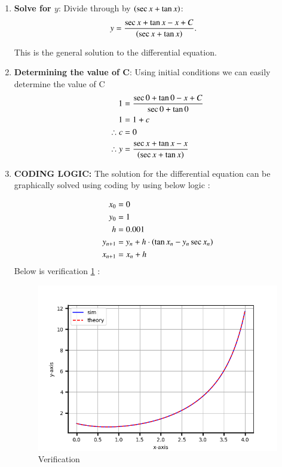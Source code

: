 \documentclass[journal]{IEEEtran}
\begin{document}
\begin{enumerate}
  \item \textbf{Solve for $y$}:
  Divide through by $\left(\sec x + \tan x\right)$:
  \begin{align}                                                                      
  	    y &= \frac{\sec x + \tan x - x + C}{\left(\sec x + \tan x\right)}.
  \end{align} 

  This is the general solution to the differential equation.
 \item \textbf{Determining the value of C}:
    Using initial conditions we can easily determine the value of C
    \begin{align}    
	    1 &= \frac{\sec {0} + \tan {0} -x +C}{\sec{0}+\tan{0}} \\
	    1 &= 1+c \\
	    \therefore c &= 0 \\
	    \therefore y &= \frac{\sec x + \tan x - x}{\left(\sec x + \tan x\right)}
    \end{align}
    \item \textbf{CODING LOGIC:} The solution for the differential equation can be graphically solved using coding by using below logic :

\begin{align} 
	x_0 &= 0 \\ 
	y_0 &= 1  \\
	h&=0.001 \\
	y_{n+1} &= y_{n} + h\cdot\left(\tan{x_n}-y_n\sec{x_n}\right) \\ 
	x_{n+1} &= x_{n} + h 
\end{align}
\newpage
Below is verification \ref{fig:example} :
\begin{figure}[h]  %
    \centering  %
    \includegraphics[width=\columnwidth]{fig/Figure_1.png}  
    \caption{Verification}
    \label{fig:example}  %
\end{figure}
\end{enumerate}
               
\end{document}
